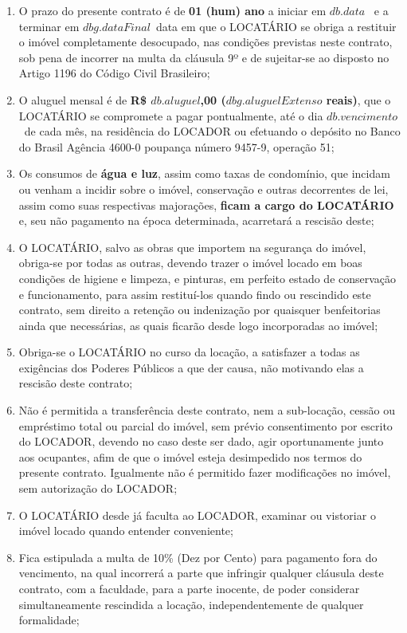 \documentclass[a4paper,12pt]{article}
\begin{document}
\begin{enumerate}

\item O prazo do presente contrato é de \textbf{01 (hum) ano} a iniciar em ${db.data}$
\ e a terminar em ${dbg.dataFinal}$\ data em que o LOCATÁRIO 
se obriga a restituir o imóvel completamente desocupado, nas condições previstas neste contrato,
sob pena de incorrer na multa da cláusula 9º e de sujeitar-se ao disposto no Artigo 1196 do Código Civil Brasileiro;
\item O aluguel mensal é de \textbf{R\$ ${db.aluguel}$,00 (${dbg.aluguelExtenso}$ reais)},
que o LOCATÁRIO se compromete a pagar pontualmente, até o dia ${db.vencimento}$\
de cada mês, na residência do LOCADOR ou efetuando o depósito no Banco do Brasil Agência 4600-0 poupança número 9457-9, operação 51; 
\item Os consumos de \textbf{água e luz}, assim como taxas de condomínio, que incidam ou venham a incidir sobre o imóvel, conservação e outras decorrentes de lei, assim como suas respectivas majorações, \textbf{ficam a cargo do LOCATÁRIO} e, seu não pagamento na época determinada, acarretará a rescisão deste; 
\item O LOCATÁRIO, salvo as obras que importem na segurança do imóvel, obriga-se por todas as outras, devendo trazer o imóvel locado em boas condições de higiene e limpeza, e pinturas, em perfeito estado de conservação e funcionamento, para assim restituí-los quando findo ou rescindido este contrato, sem direito a retenção ou indenização por quaisquer benfeitorias ainda que necessárias, as quais ficarão desde logo incorporadas ao imóvel; 
\item Obriga-se o LOCATÁRIO no curso da locação, a satisfazer a todas as exigências dos Poderes Públicos a que der causa, não motivando elas a rescisão deste contrato;  
\item Não é permitida a transferência deste contrato, nem a sub-locação, cessão ou empréstimo total ou parcial do imóvel, sem prévio consentimento por escrito do LOCADOR, devendo no caso deste ser dado, agir oportunamente junto aos ocupantes, afim de que o imóvel esteja desimpedido nos termos do presente contrato. Igualmente não é permitido fazer modificações no imóvel, sem autorização do LOCADOR;
\item O LOCATÁRIO desde já faculta ao LOCADOR, examinar ou vistoriar o imóvel locado quando entender conveniente;
\item Fica estipulada a multa de 10\% (Dez por Cento) para pagamento fora do vencimento, na qual incorrerá a parte que infringir qualquer cláusula deste contrato, com a faculdade, para a parte inocente, de poder considerar simultaneamente rescindida a locação, independentemente de qualquer formalidade;

\end{enumerate}
\end{document}
